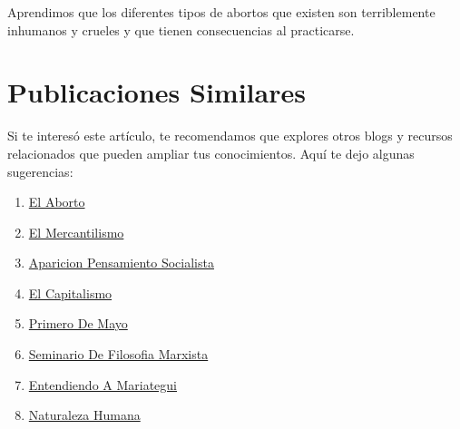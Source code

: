 \documentclass[
  jou,
  floatsintext,
  longtable,
  a4paper,
  nolmodern,
  notxfonts,
  notimes,
  12pt,
  colorlinks=true,linkcolor=blue,citecolor=blue,urlcolor=blue]{apa7}
\providecommand{\tightlist}{%
  \setlength{\itemsep}{0pt}\setlength{\parskip}{0pt}}
\begin{document}
Aprendimos que los diferentes tipos de abortos que existen son
terriblemente inhumanos y crueles y que tienen consecuencias al
practicarse.

\section{Publicaciones Similares}\label{publicaciones-similares}

Si te interesó este artículo, te recomendamos que explores otros blogs y
recursos relacionados que pueden ampliar tus conocimientos. Aquí te dejo
algunas sugerencias:

\begin{enumerate}
\def\labelenumi{\arabic{enumi}.}
\tightlist
\item
  \href{https://dialectica-y-mercado.netlify.app/posts/2015-05-14-el-aborto/index.pdf}{}
  \href{https://dialectica-y-mercado.netlify.app/posts/2015-05-14-el-aborto}{El
  Aborto}
\item
  \href{https://dialectica-y-mercado.netlify.app/posts/2017-05-23-el-mercantilismo/index.pdf}{}
  \href{https://dialectica-y-mercado.netlify.app/posts/2017-05-23-el-mercantilismo}{El
  Mercantilismo}
\item
  \href{https://dialectica-y-mercado.netlify.app/posts/2018-04-23-aparicion-pensamiento-socialista/index.pdf}{}
  \href{https://dialectica-y-mercado.netlify.app/posts/2018-04-23-aparicion-pensamiento-socialista}{Aparicion
  Pensamiento Socialista}
\item
  \href{https://dialectica-y-mercado.netlify.app/posts/2023-03-03-el-capitalismo/index.pdf}{}
  \href{https://dialectica-y-mercado.netlify.app/posts/2023-03-03-el-capitalismo}{El
  Capitalismo}
\item
  \href{https://dialectica-y-mercado.netlify.app/posts/2023-04-29-primero-de-mayo/index.pdf}{}
  \href{https://dialectica-y-mercado.netlify.app/posts/2023-04-29-primero-de-mayo}{Primero
  De Mayo}
\item
  \href{https://dialectica-y-mercado.netlify.app/posts/2023-05-19-seminario-de-filosofia-marxista/index.pdf}{}
  \href{https://dialectica-y-mercado.netlify.app/posts/2023-05-19-seminario-de-filosofia-marxista}{Seminario
  De Filosofia Marxista}
\item
  \href{https://dialectica-y-mercado.netlify.app/posts/2023-06-09-entendiendo-a-mariategui/index.pdf}{}
  \href{https://dialectica-y-mercado.netlify.app/posts/2023-06-09-entendiendo-a-mariategui}{Entendiendo
  A Mariategui}
\item
  \href{https://dialectica-y-mercado.netlify.app/posts/2023-06-09-naturaleza-humana/index.pdf}{}
  \href{https://dialectica-y-mercado.netlify.app/posts/2023-06-09-naturaleza-humana}{Naturaleza
  Humana}
\end{enumerate}
\end{document}
